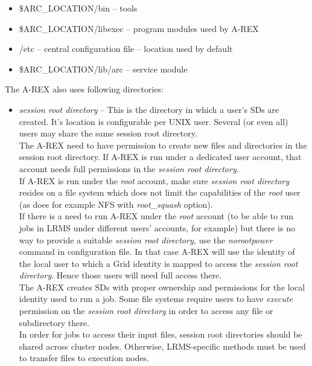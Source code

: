 \documentclass{article}                            %
\begin{document}
\begin{itemize}
\item[] \$ARC\_LOCATION/bin -- tools
\item[] \$ARC\_LOCATION/libexec -- program modules used by A-REX
\item[] /etc -- central configuration file -- location used by default
\item[] \$ARC\_LOCATION/lib/arc -- service module
\end{itemize}

The A-REX also uses following directories:

\begin{itemize}
\item \textit{session root directory} -- This is the directory in which a
user's SDs are created. It's location is configurable per UNIX user.
Several (or even all) users may share the same session root directory.\\
The A-REX need to have permission to create new files and directories
in the session root directory. If A-REX is run under a dedicated user
account, that account needs full permissions in the \textit{session
root directory}.\\
If A-REX is run under the \emph{root} account, make sure \textit{session
root directory} resides on a file system which does not limit the
capabilities of the \emph{root} user (as does for example NFS with
\emph{root\_squash} option).\\
If there is a need to run A-REX under the \emph{root} account (to
be able to run jobs in LRMS under different users' accounts, for example)
but there is no way to provide a suitable \textit{session root directory,}
use the \emph{norootpower} command in configuration file. In that
case A-REX will use the identity of the local user to which a Grid
identity is mapped to access the \textit{session root directory}.
Hence those users will need full access there.\\
The A-REX creates SDs with proper ownership and permissions for the
local identity used to run a job. Some file systems require users
to have \emph{execute} permission on the \textit{session root directory}
in order to access any file or subdirectory there.\\
In order for jobs to access their input files, session root directories
should be shared across cluster nodes. Otherwise, LRMS-specific methods
must be used to transfer files to execution nodes. 
\end{itemize}
\end{document}
